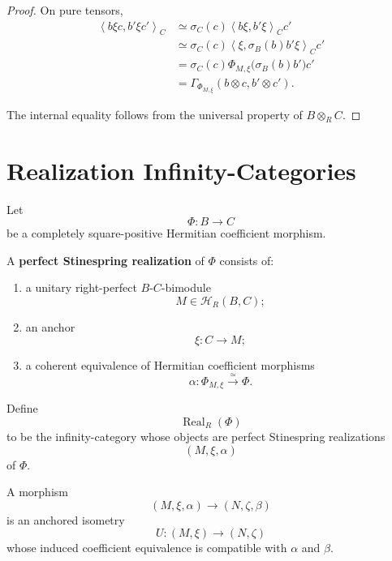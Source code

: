 \begin{proof}
On pure tensors,
\[
\begin{aligned}
  \left\langle
    b\xi c,
    b'\xi c'
  \right\rangle_C
  &\simeq
  \sigma_C(c)
  \left\langle
    b\xi,
    b'\xi
  \right\rangle_C
  c'
  \\
  &\simeq
  \sigma_C(c)
  \left\langle
    \xi,
    \sigma_B(b)b'\xi
  \right\rangle_C
  c'
  \\
  &=
  \sigma_C(c)
  \Phi_{M,\xi}
  \bigl(
    \sigma_B(b)b'
  \bigr)
  c'
  \\
  &=
  \Gamma_{\Phi_{M,\xi}}
  (b\otimes c,b'\otimes c').
\end{aligned}
\]

The internal equality follows from the universal property of
\(B\otimes_RC\).
\end{proof}

\section{Realization Infinity-Categories}
\label{sec:higher-realization-categories}

Let
\[
  \Phi:B\to C
\]
be a completely square-positive Hermitian coefficient morphism.

\begin{definition}
\label{def:higher-perfect-stinespring-realization}
A \textbf{perfect Stinespring realization} of \(\Phi\) consists of:

\begin{enumerate}
  \item a unitary right-perfect \(B\)-\(C\)-bimodule
  \[
    M\in\mathcal H_R(B,C);
  \]

  \item an anchor
  \[
    \xi:C\to M;
  \]

  \item a coherent equivalence of Hermitian coefficient morphisms
  \[
    \alpha:
    \Phi_{M,\xi}
    \xrightarrow{\simeq}
    \Phi.
  \]
\end{enumerate}
\end{definition}

\begin{definition}
\label{def:higher-realization-category}
Define
\[
  \operatorname{Real}_R(\Phi)
\]
to be the infinity-category whose objects are perfect Stinespring
realizations
\[
  (M,\xi,\alpha)
\]
of \(\Phi\).

A morphism
\[
  (M,\xi,\alpha)
  \longrightarrow
  (N,\zeta,\beta)
\]
is an anchored isometry
\[
  U:(M,\xi)\to(N,\zeta)
\]
whose induced coefficient equivalence is compatible with \(\alpha\) and
\(\beta\).
\end{definition}

